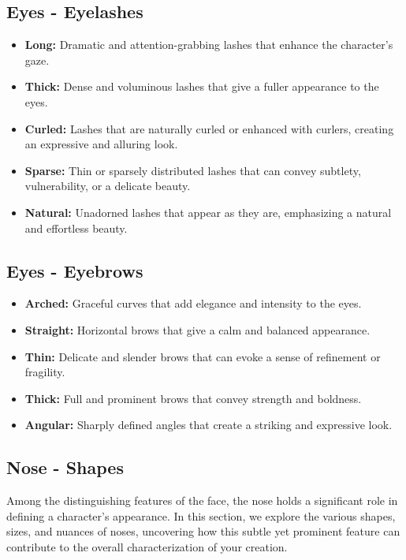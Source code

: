 \documentclass[12pt]{book}  %
\begin{document}
\subsection{\textbf{Eyes - Eyelashes}}

\begin{itemize}
    \item \textbf{Long:} Dramatic and attention-grabbing lashes that enhance the character's gaze.
    \item \textbf{Thick:} Dense and voluminous lashes that give a fuller appearance to the eyes.
    \item \textbf{Curled:} Lashes that are naturally curled or enhanced with curlers, creating an expressive and alluring look.
    \item \textbf{Sparse:} Thin or sparsely distributed lashes that can convey subtlety, vulnerability, or a delicate beauty.
    \item \textbf{Natural:} Unadorned lashes that appear as they are, emphasizing a natural and effortless beauty.
\end{itemize}

\subsection{\textbf{Eyes - Eyebrows}}

\begin{itemize}
    \item \textbf{Arched:} Graceful curves that add elegance and intensity to the eyes.
    \item \textbf{Straight:} Horizontal brows that give a calm and balanced appearance.
    \item \textbf{Thin:} Delicate and slender brows that can evoke a sense of refinement or fragility.
    \item \textbf{Thick:} Full and prominent brows that convey strength and boldness.
    \item \textbf{Angular:} Sharply defined angles that create a striking and expressive look.
\end{itemize}

\subsection{\textbf{Nose - Shapes}}

Among the distinguishing features of the face, the nose holds a significant role in defining a character's appearance. In this section, we explore the various shapes, sizes, and nuances of noses, uncovering how this subtle yet prominent feature can contribute to the overall characterization of your creation.
\end{document}
